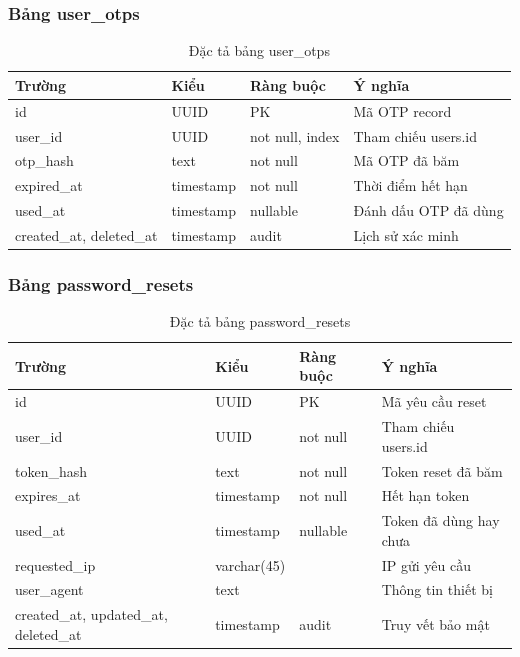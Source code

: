 \documentclass[../DoAn.tex]{subfiles}
\begin{document}
\subsubsection{Bảng user\_otps}
\begin{table}[H]
\centering
\caption{Đặc tả bảng user\_otps}
\scriptsize
\begin{tabular}{|l|l|l|p{4cm}|}
\hline
\textbf{Trường} & \textbf{Kiểu} & \textbf{Ràng buộc} & \textbf{Ý nghĩa} \\ \hline
id & UUID & PK & Mã OTP record \\ \hline
user\_id & UUID & not null, index & Tham chiếu users.id \\ \hline
otp\_hash & text & not null & Mã OTP đã băm \\ \hline
expired\_at & timestamp & not null & Thời điểm hết hạn \\ \hline
used\_at & timestamp & nullable & Đánh dấu OTP đã dùng \\ \hline
created\_at, deleted\_at & timestamp & audit & Lịch sử xác minh \\ \hline
\end{tabular}
\end{table}

\subsubsection{Bảng password\_resets}
\begin{table}[H]
\centering
\caption{Đặc tả bảng password\_resets}
\scriptsize
\begin{tabular}{|l|l|l|p{4cm}|}
\hline
\textbf{Trường} & \textbf{Kiểu} & \textbf{Ràng buộc} & \textbf{Ý nghĩa} \\ \hline
id & UUID & PK & Mã yêu cầu reset \\ \hline
user\_id & UUID & not null & Tham chiếu users.id \\ \hline
token\_hash & text & not null & Token reset đã băm \\ \hline
expires\_at & timestamp & not null & Hết hạn token \\ \hline
used\_at & timestamp & nullable & Token đã dùng hay chưa \\ \hline
requested\_ip & varchar(45) & & IP gửi yêu cầu \\ \hline
user\_agent & text & & Thông tin thiết bị \\ \hline
created\_at, updated\_at, deleted\_at & timestamp & audit & Truy vết bảo mật \\ \hline
\end{tabular}
\end{table}
\end{document}

